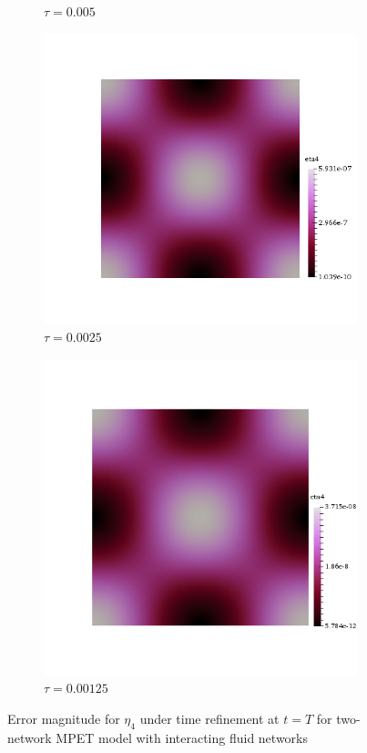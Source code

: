 \begin{figure}[h!]
\begin{subfigure}[b]{0.24\textwidth}
    \caption{$\tau=0.005$}
  \end{subfigure}
  \begin{subfigure}[b]{0.24\textwidth}
    \includegraphics[width=\textwidth,height=\textheight,keepaspectratio,height=\textheight,keepaspectratio]{figures/2_mpet/default/time/eta4_dt3.png}
    \caption{$\tau=0.0025$}
  \end{subfigure}
  \begin{subfigure}[b]{0.24\textwidth}
    \includegraphics[width=\textwidth,height=\textheight,keepaspectratio,height=\textheight,keepaspectratio]{figures/2_mpet/default/time/eta4_dt4.png}
    \caption{$\tau=0.00125$}
  \end{subfigure}
  \caption{Error magnitude for $\eta_4$ under time refinement at $t=T$ for two-network MPET model with interacting fluid networks} \label{fig:bb_default_eta4}
\end{figure}
\mbox{} 
